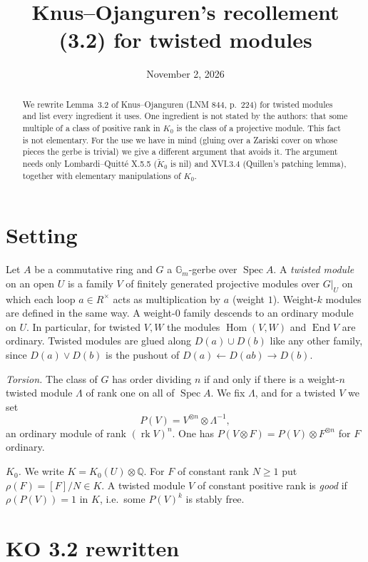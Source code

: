 \documentclass[11pt]{amsart}
\title{Knus--Ojanguren's recollement (3.2) for twisted modules}
\date{November 2, 2026}
\theoremstyle{definition}
\theoremstyle{remark}
\newcommand{\Spec}{\operatorname{Spec}}
\newcommand{\Hom}{\operatorname{Hom}}
\newcommand{\End}{\operatorname{End}}
\newcommand{\rk}{\operatorname{rk}}
\newcommand{\Q}{\mathbb Q}
\newcommand{\Kt}{\widetilde K_0}
\begin{document}
\begin{abstract}
We rewrite Lemma~3.2 of Knus--Ojanguren (LNM 844, p.~224) for twisted
modules and list every ingredient it uses. One ingredient is not stated by
the authors: that some multiple of a class of positive rank in $K_0$ is the
class of a projective module. This fact is not elementary. For the use we
have in mind (gluing over a Zariski cover on whose pieces the gerbe is
trivial) we give a different argument that avoids it. The argument needs
only Lombardi--Quitt\'e X.5.5 ($\Kt$ is nil) and XVI.3.4 (Quillen's
patching lemma), together with elementary manipulations of $K_0$.
\end{abstract}
\maketitle

\section{Setting}

Let $A$ be a commutative ring and $G$ a $\mathbb G_m$-gerbe over $\Spec A$.
A \emph{twisted module} on an open $U$ is a family $V$ of finitely generated
projective modules over $G|_U$ on which each loop $a\in R^\times$ acts as
multiplication by $a$ (weight $1$). Weight-$k$ modules are defined in the
same way. A weight-$0$ family descends to an ordinary module on $U$. In
particular, for twisted $V,W$ the modules $\Hom(V,W)$ and $\End V$ are
ordinary. Twisted modules are glued along $D(a)\cup D(b)$ like any other
family, since $D(a)\vee D(b)$ is the pushout of $D(a)\leftarrow D(ab)\to
D(b)$.

\emph{Torsion.} The class of $G$ has order dividing $n$ if and only if there
is a weight-$n$ twisted module $\Lambda$ of rank one on all of $\Spec A$. We
fix $\Lambda$, and for a twisted $V$ we set
\[ P(V)=V^{\otimes n}\otimes\Lambda^{-1},\]
an ordinary module of rank $(\rk V)^n$. One has $P(V\otimes F)=P(V)\otimes
F^{\otimes n}$ for $F$ ordinary.

\emph{$K_0$.} We write $K=K_0(U)\otimes\Q$. For $F$ of constant rank $N\geq
1$ put $\rho(F)=[F]/N\in K$. A twisted module $V$ of constant positive rank
is \emph{good} if $\rho(P(V))=1$ in $K$, i.e.\ some $P(V)^{k}$ is stably
free.

\section{KO 3.2 rewritten}
\end{document}
